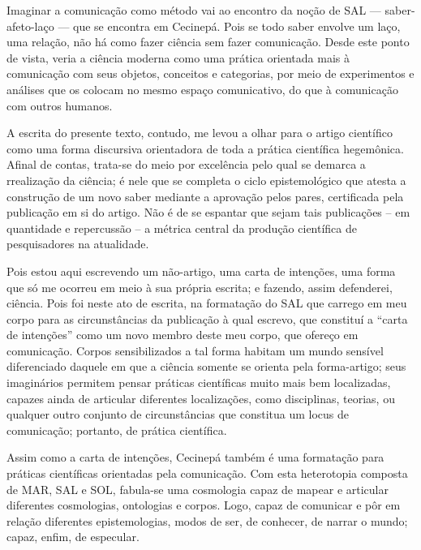 Imaginar a comunicação como método vai ao encontro da noção de SAL --- saber-afeto-laço --- que se encontra em Cecinepá. Pois se todo saber envolve um laço, uma relação, não há como fazer ciência sem fazer comunicação. Desde este ponto de vista, veria a ciência moderna como uma prática orientada mais à comunicação com seus objetos, conceitos e categorias, por meio de experimentos e análises que os colocam no mesmo espaço comunicativo, do que à comunicação com outros humanos.

A escrita do presente texto, contudo, me levou a olhar para o artigo científico como uma forma discursiva orientadora de toda a prática científica hegemônica. Afinal de contas, trata-se do meio por excelência pelo qual se demarca a rrealização da ciência; é nele que se completa o ciclo epistemológico que atesta a construção de um novo saber mediante a aprovação pelos pares, certificada pela publicação em si do artigo. Não é de se espantar que sejam tais publicações -- em quantidade e repercussão -- a métrica central da produção científica de pesquisadores na atualidade.

Pois estou aqui escrevendo um não-artigo, uma carta de intenções, uma forma que só me ocorreu em meio à sua própria escrita; e fazendo, assim defenderei, ciência. Pois foi neste ato de escrita, na formatação do SAL que carrego em meu corpo para as circunstâncias da publicação à qual escrevo, que constituí a \enquote{carta de intenções} como um novo membro deste meu corpo, que ofereço em comunicação. Corpos sensibilizados a tal forma habitam um mundo sensível diferenciado daquele em que a ciência somente se orienta pela forma-artigo; seus imaginários permitem pensar práticas científicas muito mais bem localizadas, capazes ainda de articular diferentes localizações, como disciplinas, teorias, ou qualquer outro conjunto de circunstâncias que constitua um locus de comunicação; portanto, de prática científica.

Assim como a carta de intenções, Cecinepá também é uma formatação para práticas científicas orientadas pela comunicação. Com esta heterotopia composta de MAR, SAL e SOL, fabula-se uma cosmologia capaz de mapear e articular diferentes cosmologias, ontologias e corpos. Logo, capaz de comunicar e pôr em relação diferentes epistemologias, modos de ser, de conhecer, de narrar o mundo; capaz, enfim, de especular.


